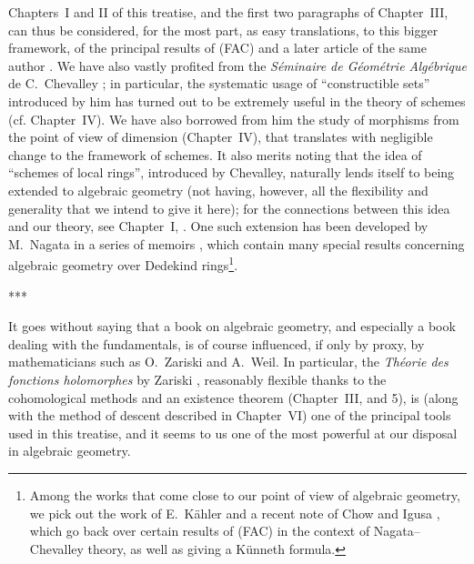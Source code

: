 \documentclass[openany,oneside]{amsbook}
\theoremstyle{ega-env-style}
\theoremstyle{ega-thm-env-style}
\theoremstyle{ega-defn-env-style}
\newcommand{\oldpage}[2][--]{{\marginpar{\textbf{#1}~|~#2}}\ignorespaces}
\def\sectionbreak{\begin{center}***\end{center}}
\begin{document}
Chapters~I and II of this treatise, and the first two paragraphs of Chapter~III, can thus be considered, for the most part, as easy translations, to this bigger framework, of the principal results of (FAC) and a later article of the same author \cite{I-15}.
We have also vastly profited from the \emph{S\'eminaire de G\'eom\'etrie Alg\'ebrique} de C.~Chevalley \cite{I-1};
in particular, the systematic usage of ``constructible sets'' introduced by him has turned out to be extremely useful in the theory of schemes (cf. Chapter~IV).
We have also borrowed from him the study of morphisms from\oldpage[I]{8} the point of view of dimension (Chapter~IV), that translates with negligible change to the framework of schemes.
It also merits noting that the idea of ``schemes of local rings'', introduced by Chevalley, naturally lends itself to being extended to algebraic geometry (not having, however, all the flexibility and generality that we intend to give it here);
for the connections between this idea and our theory, see Chapter~I, .
One such extension has been developed by M.~Nagata in a series of memoirs \cite{I-9}, which contain many special results concerning algebraic geometry over Dedekind rings\footnote{Among the works that come close to our point of view of algebraic geometry, we pick out the work of E.~K\"ahler \cite{I-22} and a recent note of Chow and Igusa \cite{I-3}, which go back over certain results of (FAC) in the context of Nagata--Chevalley theory, as well as giving a K\"unneth formula.}.

\sectionbreak

It goes without saying that a book on algebraic geometry, and especially a book dealing with the fundamentals, is of course influenced, if only by proxy, by mathematicians such as O.~Zariski and A.~Weil.
In particular, the \emph{Th\'eorie des fonctions holomorphes} by Zariski \cite{I-20}, reasonably flexible thanks to the cohomological methods and an existence theorem (Chapter~III, \textsection{} and 5), is (along with the method of descent described in Chapter~VI) one of the principal tools used in this treatise, and it seems to us one of the most powerful at our disposal in algebraic geometry.
\end{document}
